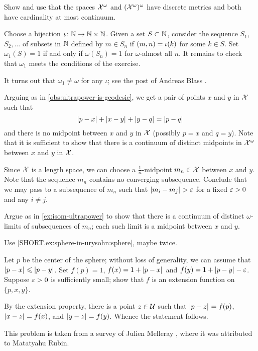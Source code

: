 Show and use that the spaces $\mathcal{X}^\omega$ and $(\mathcal{X}^\omega)^\omega$ have discrete metrics and both have cardinality at most continuum.


Choose a bijection $\iota\colon\mathbb{N}\to \mathbb{N}\times \mathbb{N}$.
Given a set $S\subset \mathbb{N}$, consider the sequence $S_1$, $S_2,\dots$ of subsets in $\mathbb{N}$ defined by $m\in S_n$ if $(m,n)\z=\iota(k)$ for some $k\in S$.
Set $\omega_1(S)=1$ if and only if $\omega(S_n)=1$ for $\omega$-almost all $n$.
It remains to check that $\omega_1$ meets the conditions of the exercise.

It turns out that $\omega_1\ne \omega$ for any $\iota$;
see the post of Andreas Blass \cite{blass}.

Arguing as in \ref{obs:ultrapower-is-geodesic}, we get a pair of points $x$ and $y$ in $\mathcal{X}$ such that
\[\dist{p}{x}{}+\dist{x}{y}{}+\dist{y}{q}{}=\dist{p}{q}{}\]
and there is no midpoint between $x$ and $y$ in $\mathcal{X}$
(possibly $p=x$ and $q=y$).
Note that it is sufficient to show that there is a continuum of distinct midpoints in $\mathcal{X}^\omega$ between $x$ and $y$ in $\mathcal{X}$.

Since $\mathcal{X}$ is a length space, we can choose a $\tfrac1n$-midpoint $m_n\in\mathcal{X}$ between $x$ and $y$.
Note that the sequence $m_n$ contains no converging subsequence.
Conclude that we may pass to a subsequence of $m_n$ such that $\dist{m_i}{m_j}{}>\eps$ for a fixed $\varepsilon>0$ and any $i\ne j$.

Argue as in \ref{ex:isom-ultrapower} to show that there is a continuum of distinct $\omega$-limits of subsequences of $m_n$;
each such limit is a midpoint between $x$ and $y$.

Use \ref{SHORT.ex:sphere-in-urysohn:sphere}, maybe twice.

Let $p$ be the center of the sphere;
without loss of generality, we can assume that $\dist{p}{x}{}\le \dist{p}{y}{}$.
Set $f(p)=1$, $f(x)=1+\dist{p}{x}{}$ and $f(y)=1+\dist{p}{y}{}-\eps$.
Suppose $\varepsilon>0$ is sufficiently small;
show that $f$ is an extension function on $\{p,x,y\}$.

By the extension property, there is a point $z\in \mathcal{U}$ such that $\dist{p}{z}{}=f(p)$, $\dist{x}{z}{}=f(x)$, and $\dist{y}{z}{}=f(y)$.
Whence the statement follows.

 This problem is taken from a survey of Julien Melleray
 \cite[Prop. 4.3]{melleray}, where it was attributed to Matatyahu Rubin.

